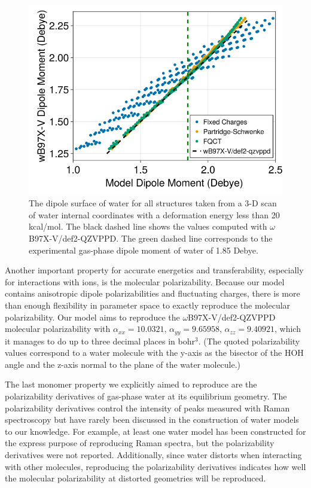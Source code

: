 \documentclass[journal=jctcce,manuscript=article]{achemso}
\begin{document}
\begin{figure}[H]
  \includegraphics*[width=\textwidth]{figures/dipole_surface.png}
  \caption{The dipole surface of water for all structures taken from a
  3-D scan of water internal coordinates with a deformation energy less than
  20 kcal/mol. The black dashed line shows the values computed with $\omega$B97X-V/def2-QZVPPD.
  The green dashed line corresponds to the experimental gas-phase dipole moment
  of water of 1.85 Debye.
}
  \label{fig:dipole_surface}
\end{figure}

Another important property for accurate energetics and transferability, especially for interactions with ions, is the molecular polarizability. Because our model contains anisotropic dipole polarizabilities and fluctuating charges, there is more than enough flexibility in parameter space to exactly reproduce the molecular polarizability. Our model aims to reproduce the $\omega$B97X-V/def2-QZVPPD molecular polarizability with $\alpha_{xx}=10.0321$, $\alpha_{yy}=9.65958$, $\alpha_{zz}=9.40921$, which it manages to do up to three decimal places in bohr$^3$. (The quoted polarizability values correspond to a water molecule with the y-axis as the bisector of the HOH angle and the z-axis normal to the plane of the water molecule.)

The last monomer property we explicitly aimed to reproduce are the polarizability derivatives of gas-phase water at its equilibrium geometry. The polarizability derivatives control the intensity of peaks measured with Raman spectroscopy but have rarely been discussed in the construction of water models to our knowledge. For example, at least one water model has been constructed for the express purpose of reproducing Raman spectra\cite{sidler2018efficient}, but the polarizability derivatives were not reported. Additionally, since water distorts when interacting with other molecules, reproducing the polarizability derivatives indicates how well the molecular polarizability at distorted geometries will be reproduced. 
\end{document}
